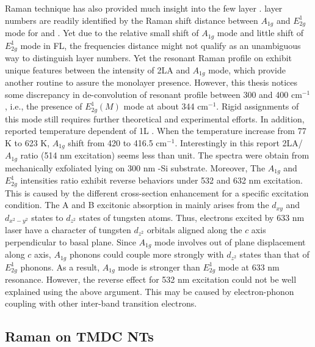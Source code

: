 Raman technique has also provided much insight into the few layer .  layer numbers are readily identified by the Raman shift distance between $A_{1g}$ and $E_{2g}^1$ mode for \cite{Buscema2013} and \cite{Berkdemir2013}. Yet due to the relative small shift of $A_{1g}$ mode and little shift of $E_{2g}^1$ mode in  FL, the frequencies distance might not qualify as an unambiguous way to distinguish layer numbers. Yet the resonant Raman profile on  exhibit unique features between the intensity of 2LA and $A_{1g}$ mode,\cite{Berkdemir2013,Zhao2013} which provide another routine to assure the monolayer presence. However, this thesis notices some discrepancy in de-convolution of  resonant profile between 300 and 400 cm$^{-1}$, i.e., the presence of $E_{2g}^1(M)$ mode at about 344 cm$^{-1}$.\cite{Peimyoo2013,Cong2013,Berkdemir2013} Rigid assignments of this mode still requires further theoretical\cite{Ataca2012} and experimental efforts. In addition, \citeauthor{M2013} reported temperature dependent of 1L .\cite{M2013} When the temperature increase from 77 K to 623 K, $A_{1g}$ shift from 420 to 416.5 cm$^{-1}$. Interestingly in this report 2LA/$A_{1g}$ ratio (514 nm excitation) seems less than unit. The spectra were obtain from mechanically exfoliated  lying on 300 nm -Si substrate. Moreover, The $A_{1g}$ and $E_{2g}^1$ intensities ratio exhibit reverse behaviors under 532 and 632 nm excitation. This is caused by the different cross-section enhancement for a specific excitation condition. The A and B excitonic absorption in  mainly arises from the $d_{xy}$ and $d_{x^2 - y^2}$ states to $d_{z^2}$ states of tungsten atoms. Thus, electrons excited by 633 nm laser have a character of tungsten $d_{z^2}$ orbitals aligned along the $c$ axis perpendicular to  basal plane. Since $A_{1g}$ mode involves out of plane displacement along $c$ axis, $A_{1g}$ phonons could couple more strongly with $d_{z^2}$ states than that of $E_{2g}^1$ phonons. As a result, $A_{1g}$ mode is stronger than $E_{2g}^1$ mode at 633 nm resonance.\cite{Zhao2013} However, the reverse effect for 532 nm excitation could not be well explained using the above argument. This may be caused by electron-phonon coupling with other inter-band transition electrons.

\subsection{Raman on TMDC NTs}\label{sec:ntram}

